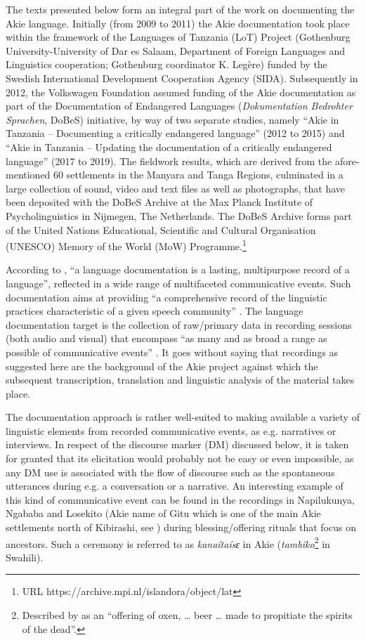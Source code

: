 \documentclass[output=paper,colorlinks,citecolor=brown]{langscibook}
\begin{document}
The texts presented below form an integral part of the work on documenting the Akie language. Initially (from 2009 to 2011) the Akie documentation took place within the framework of the Languages of Tanzania (LoT) Project (Gothenburg University-University of Dar es Salaam, Department of Foreign Languages and Linguistics cooperation; Gothenburg coordinator K. Legère) funded by the Swedish International Development Cooperation Agency (SIDA). Subsequently in 2012, the Volkswagen Foundation assumed funding of the Akie documentation as part of the Documentation of Endangered Languages (\textit{Dokumentation Bedrohter Sprachen}, DoBeS) initiative, by way of two separate studies, namely “Akie in Tanzania – Documenting a critically endangered language” (2012 to 2015) and “Akie in Tanzania – Updating the documentation of a critically endangered language” (2017 to 2019). The fieldwork results, which are derived from the afore-mentioned 60 settlements in the Manyara and Tanga Regions, culminated in a large collection of sound, video and text files as well as photographs, that have been deposited with the DoBeS Archive at the Max Planck Institute of Psycholinguistics in Nijmegen, The Netherlands. The DoBeS Archive forms part of the United Nations Educational, Scientific and Cultural Organisation (UNESCO) Memory of the World (MoW) Programme.\footnote{URL https://archive.mpi.nl/islandora/object/lat}

According to \citep[1]{HimmelmannEtAl2006}, “a language documentation is a lasting, multipurpose record of a language”, reflected in a wide range of multifaceted communicative events. Such documentation aims at providing “a comprehensive record of the linguistic practices characteristic of a given speech community” \citep[166]{Himmelmann1998}. The language documentation target is the collection of raw/primary data in recording sessions (both audio and visual) that encompass “as many and as broad a range as possible of communicative events” \citep[7]{HimmelmannEtAl2006} . It goes without saying that recordings as suggested here are the background of the Akie project against which the subsequent transcription, translation and linguistic analysis of the material takes place.

The documentation approach is rather well-suited to making available a variety of linguistic elements from recorded communicative events, as e.g. narratives or interviews. In respect of the discourse marker (DM) discussed below, it is taken for granted that its elicitation would probably not be easy or even impossible, as any DM use is associated with the flow of discourse such as the spontaneous utterances during e.g. a conversation or a narrative. An interesting example of this kind of communicative event can be found in the recordings in Napilukunya, Ngababa and Losekito (Akie name of Gitu which is one of the main Akie settlements north of Kibirashi, see ) during blessing/offering rituals that focus on  ancestors. Such a ceremony is referred to as \textit{kanaítaísɛ} in Akie (\textit{tambiko}\footnote{Described by \cite[449]{Johnson1939} as an “offering of oxen, … beer … made to propitiate the spirits of the dead”.} in Swahili). 
\end{document}
